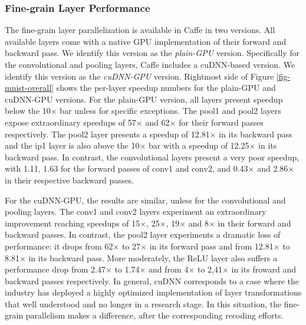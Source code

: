 
\subsubsection{Fine-grain Layer Performance}
The fine-grain layer parallelization is available in Caffe in two versions. 
All available layers come with a native GPU implementation of their 
forward and backward pass. We identify this version as the \emph{plain-GPU} 
version. Specifically for the convolutional and pooling layers, Caffe 
includes a cuDNN-based version. We identify this version as the 
\emph{cuDNN-GPU} version. 
Rightmost side of Figure \ref{fig-mnist-overall} shows the per-layer 
speedup numbers for the plain-GPU and cuDNN-GPU versions. 
For the plain-GPU version, all layers present speedup below 
the 10$\times$ bar unless for specific exceptions. The pool1 and pool2 
layers expose extraordinary speedups of 57$\times$ and 62$\times$ for their 
forward passes respectively. The pool2 layer presents a speedup of 
12.81$\times$ in its backward pass and the ip1 layer is also above the 
10$\times$ bar with a speedup of 12.25$\times$ in its backward pass.
In contrast, the convolutional layers present a very poor speedup, with 
1.11, 1.63 for the forward passes of conv1 and conv2, and 0.43$\times$ and 2.86$\times$ 
in their respective backward passes. 

For the cuDNN-GPU, the results are similar, unless for the convolutional 
and pooling layers. The conv1 and conv2 layers experiment an extraordinary 
improvement reaching speedups of 15$\times$, 25$\times$, 19$\times$ and 8$\times$ in their 
forward and backward passes. In contrast, the pool2 layer experiments a 
dramatic loss of performance: it drops from 62$\times$ to 27$\times$ in its forward 
pass and from 12.81$\times$ to 8.81$\times$ in its backward pass. More moderately, 
the ReLU layer also suffers a performance drop from 2.47$\times$ to 1.74$\times$ and 
from 4$\times$ to 2,41$\times$ in its froward and backward passes respectively. 
In general, cuDNN corresponds to a case where the industry has deployed 
a highly optimized implementation of layer transformations that well 
understood and no longer in a research stage. In this situation, the 
fine-grain parallelism makes a difference, after the corresponding recoding 
efforts.

